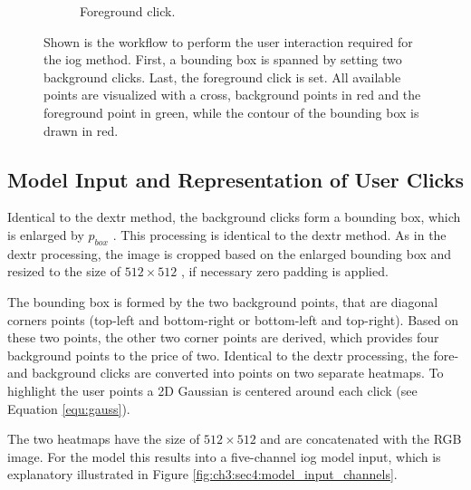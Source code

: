 \begin{figure}
\begin{subfigure}[b]{0.3\textwidth}
		\caption{Foreground click.}
		\label{fig:ch3:sec4:iog_workflow_3}
	\end{subfigure}
	\caption[IOG User Interaction]{
		Shown is the workflow to perform the user interaction required for the \gls{iog} method.
		First, a bounding box is spanned by setting two background clicks.
		Last, the foreground click is set.
		All available points are visualized with a cross, background points in red and the foreground point in green, while the contour of the bounding box is drawn in red.
	} 
	\label{fig:ch3:sec4:iog_user_clicks}
\end{figure}

\subsection{Model Input and Representation of User Clicks}\label{ord:ch3:sec4:subsec2}

Identical to the \gls{dextr} method, the background clicks form a bounding box, which is enlarged by  $p_{{box}}$ .
This processing is identical to the \gls{dextr} method.
As in the \gls{dextr} processing, the image is cropped based on the enlarged bounding box and resized to the size of $512 \times 512$ , if necessary zero padding is applied.

The bounding box is formed by the two background points, that are diagonal corners points (top-left and bottom-right or bottom-left and top-right).
Based on these two points, the other two corner points are derived, which provides four background points to the price of two.
Identical to the \gls{dextr} processing, the fore- and background clicks are converted into points on two separate heatmaps.
To highlight the user points a 2D Gaussian is centered around each click (see Equation \ref{equ:gauss}).

The two heatmaps have the size of $512 \times 512$  and are concatenated with the RGB image.
For the model this results into a five-channel \gls{iog} model input, which is explanatory illustrated in Figure \ref{fig:ch3:sec4:model_input_channels}.

